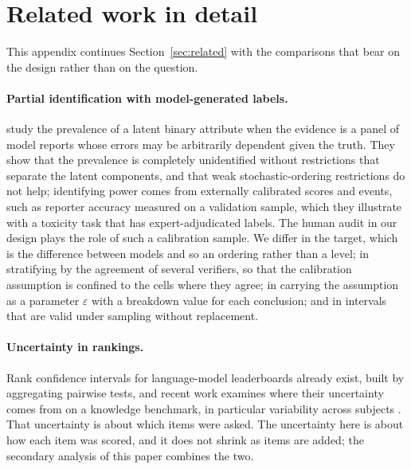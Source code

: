 

\clearpage

\section{Related work in detail}
\label{app:related}

This appendix continues Section~\ref{sec:related} with the comparisons that bear on the design
rather than on the question.

\paragraph{Partial identification with model-generated labels.}
\citet{chen2026partial} study the prevalence of a latent binary attribute when the evidence is a
panel of model reports whose errors may be arbitrarily dependent given the truth. They show that
the prevalence is completely unidentified without restrictions that separate the latent
components, and that weak stochastic-ordering restrictions do not help; identifying power comes
from externally calibrated scores and events, such as reporter accuracy measured on a validation
sample, which they illustrate with a toxicity task that has expert-adjudicated labels. The human
audit in our design plays the role of such a calibration sample. We differ in the target, which
is the difference between models and so an ordering rather than a level; in stratifying by the
agreement of several verifiers, so that the calibration assumption is confined to the cells where
they agree; in carrying the assumption as a parameter $\varepsilon$ with a breakdown value for
each conclusion; and in intervals that are valid under sampling without replacement.

\paragraph{Uncertainty in rankings.}
Rank confidence intervals for language-model leaderboards already exist, built by aggregating
pairwise tests, and recent work examines where their uncertainty comes from on a knowledge
benchmark, in particular variability across subjects \citep{neuhof2026ranking}. That uncertainty is
about which items were asked. The uncertainty here is about how each item was scored, and it
does not shrink as items are added; the secondary analysis of this paper combines the two.

